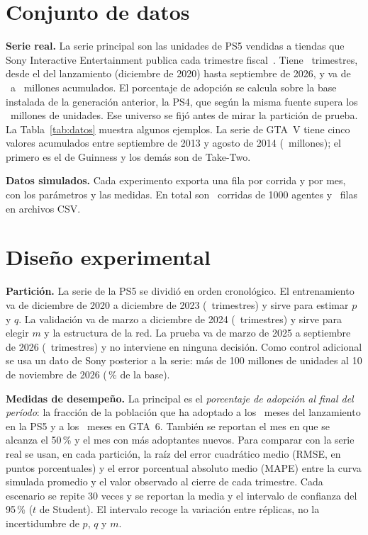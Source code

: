\documentclass{llncs}
\begin{document}
\section{Conjunto de datos}
\label{sec:datos}

\textbf{Serie real.} La serie principal son las unidades de PS5 vendidas a tiendas que Sony Interactive Entertainment publica cada trimestre fiscal~\cite{sony2026}. Tiene \cifraTrimestres\ trimestres, desde el del lanzamiento (diciembre de 2020) hasta septiembre de 2026, y va de \cifraPsUnidadesIni\ a \cifraPsUnidadesFin\ millones acumulados. El porcentaje de adopción se calcula sobre la base instalada de la generación anterior, la PS4, que según la misma fuente supera los \cifraUniverso\ millones de unidades. Ese universo se fijó antes de mirar la partición de prueba. La Tabla~\ref{tab:datos} muestra algunos ejemplos. La serie de GTA~V tiene cinco valores acumulados entre septiembre de 2013 y agosto de 2014 (\cifraGtavSerie\ millones); el primero es el de Guinness y los demás son de Take-Two.



\textbf{Datos simulados.} Cada experimento exporta una fila por corrida y por mes, con los parámetros y las medidas. En total son \cifraCorridas\ corridas de 1000 agentes y \cifraFilas\ filas en archivos CSV.

\section{Diseño experimental}
\label{sec:diseno}

\textbf{Partición.} La serie de la PS5 se dividió en orden cronológico. El entrenamiento va de diciembre de 2020 a diciembre de 2023 (\cifraObsEnt\ trimestres) y sirve para estimar $p$ y $q$. La validación va de marzo a diciembre de 2024 (\cifraObsVal\ trimestres) y sirve para elegir $m$ y la estructura de la red. La prueba va de marzo de 2025 a septiembre de 2026 (\cifraObsPru\ trimestres) y no interviene en ninguna decisión. Como control adicional se usa un dato de Sony posterior a la serie: más de 100 millones de unidades al 10 de noviembre de 2026 (\cifraControlReal\,\% de la base).

\textbf{Medidas de desempeño.} La principal es el \emph{porcentaje de adopción al final del período}: la fracción de la población que ha adoptado a los \cifraHorizontePs\ meses del lanzamiento en la PS5 y a los \cifraHorizonteGta\ meses en GTA~6. También se reportan el mes en que se alcanza el 50\,\% y el mes con más adoptantes nuevos. Para comparar con la serie real se usan, en cada partición, la raíz del error cuadrático medio (RMSE, en puntos porcentuales) y el error porcentual absoluto medio (MAPE) entre la curva simulada promedio y el valor observado al cierre de cada trimestre. Cada escenario se repite 30 veces y se reportan la media y el intervalo de confianza del 95\,\% ($t$ de Student). El intervalo recoge la variación entre réplicas, no la incertidumbre de $p$, $q$ y $m$.
\end{document}
